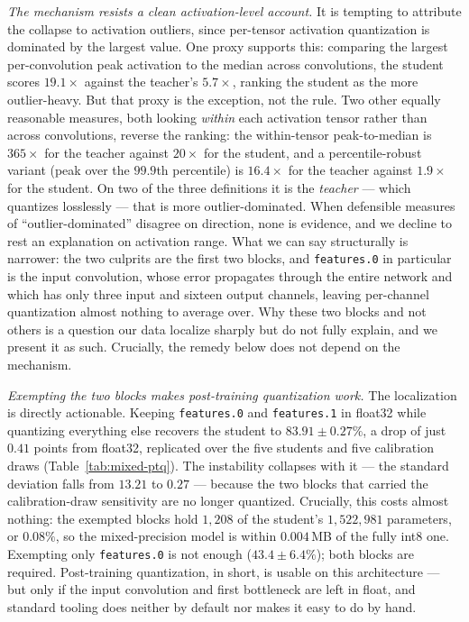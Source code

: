 \documentclass[conference]{IEEEtran}
\begin{document}
\emph{The mechanism resists a clean activation-level account.} It is tempting to
attribute the collapse to activation outliers, since per-tensor activation
quantization is dominated by the largest value. One proxy supports this: comparing
the largest per-convolution peak activation to the median across convolutions, the
student scores $19.1\times$ against the teacher's $5.7\times$, ranking the student
as the more outlier-heavy. But that proxy is the exception, not the rule. Two other
equally reasonable measures, both looking \emph{within} each activation tensor
rather than across convolutions, reverse the ranking: the within-tensor
peak-to-median is $365\times$ for the teacher against $20\times$ for the student,
and a percentile-robust variant (peak over the $99.9$th percentile) is $16.4\times$
for the teacher against $1.9\times$ for the student. On two of the three
definitions it is the \emph{teacher} --- which quantizes losslessly --- that is
more outlier-dominated. When defensible measures of ``outlier-dominated'' disagree
on direction, none is evidence, and we decline to rest an explanation on activation
range. What we can say structurally is narrower: the two culprits are the first two
blocks, and \texttt{features.0} in particular is the input convolution, whose error
propagates through the entire network and which has only three input and sixteen
output channels, leaving per-channel quantization almost nothing to average over.
Why these two blocks and not others is a question our data localize sharply but do
not fully explain, and we present it as such. Crucially, the remedy below does not
depend on the mechanism.

\emph{Exempting the two blocks makes post-training quantization work.} The
localization is directly actionable. Keeping \texttt{features.0} and
\texttt{features.1} in float32 while quantizing everything else recovers the
student to $83.91\pm0.27\%$, a drop of just $0.41$ points from float32, replicated
over the five students and five calibration draws (Table~\ref{tab:mixed-ptq}).
The instability collapses with it --- the standard deviation falls from $13.21$ to
$0.27$ --- because the two blocks that carried the calibration-draw sensitivity
are no longer quantized. Crucially, this costs almost nothing: the exempted blocks
hold $1{,}208$ of the student's $1{,}522{,}981$ parameters, or $0.08\%$, so the
mixed-precision model is within $0.004$\,MB of the fully int8 one. Exempting only
\texttt{features.0} is not enough ($43.4\pm6.4\%$); both blocks are required.
Post-training quantization, in short, is usable on this architecture --- but only
if the input convolution and first bottleneck are left in float, and standard
tooling does neither by default nor makes it easy to do by hand.
\end{document}
